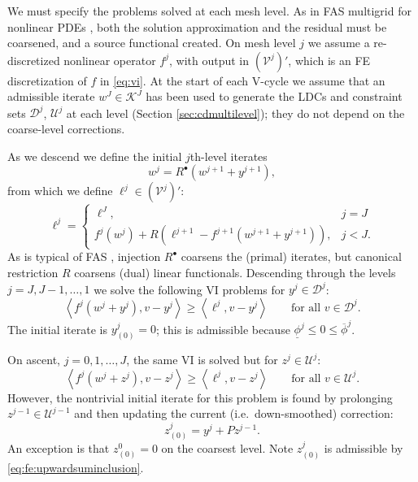 \documentclass[review,hidelinks,onefignum,onetabnum,final]{siamart220329}  %
\newcommand{\cV}{\mathcal{V}}
\newcommand{\ip}[2]{\left<#1,#2\right>}
\newcommand{\iR}{R^{\bullet}}
\begin{document}
We must specify the problems solved at each mesh level.  As in FAS multigrid for nonlinear PDEs \cite{BrandtLivne2011,Bruneetal2015,Trottenbergetal2001}, both the solution approximation and the residual must be coarsened, and a source functional created.  On mesh level $j$ we assume a re-discretized nonlinear operator $f^j$, with output in $(\cV^j)'$, which is an FE discretization of $f$ in \eqref{eq:vi}.  At the start of each V-cycle we assume that an admissible iterate $w^J \in \mathcal{K}^J$ has been used to generate the LDCs and constraint sets $\mathcal{D}^j$, $\mathcal{U}^j$ at each level (Section \ref{sec:cdmultilevel}); they do not depend on the coarse-level corrections.

As we descend we define the initial $j$th-level iterates
\begin{equation}
w^j = \iR(w^{j+1} + y^{j+1}),  \label{eq:fe:definew}
\end{equation}
from which we define $\ell^j \in (\cV^j)'$:
\begin{equation}
\ell^j = \begin{cases} \ell^J, & j=J \\
                       f^j(w^j) + R\left(\ell^{j+1}-f^{j+1}(w^{j+1}+y^{j+1})\right), & j<J. \end{cases} \label{eq:fe:levelsource}
\end{equation}
As is typical of FAS \cite[section 5.3]{Trottenbergetal2001}, injection $\iR$ coarsens the (primal) iterates, but canonical restriction $R$ coarsens (dual) linear functionals.  Descending through the levels $j=J,J-1,\dots,1$ we solve the following VI problems for $y^j \in \mathcal{D}^j$:
\begin{equation}
\ip{f^j(w^j + y^j)}{v-y^j} \ge \ip{\ell^j}{v-y^j} \qquad \text{for all } v\in \mathcal{D}^j. \label{eq:fe:downvi}
\end{equation}
The initial iterate is $y_{(0)}^j=0$; this is admissible because $\underline{\phi}^j \le 0 \le \overline{\phi}^j$.

On ascent, $j=0,1,\dots,J$, the same VI is solved but for $z^j \in \mathcal{U}^j$:
\begin{equation}
\ip{f^j(w^j + z^j)}{v-z^j} \ge \ip{\ell^j}{v-z^j} \qquad \text{for all } v\in \mathcal{U}^j. \label{eq:fe:upvi}
\end{equation}
However, the nontrivial initial iterate for this problem is found by prolonging $z^{j-1} \in \mathcal{U}^{j-1}$ and then updating the current (i.e.~down-smoothed) correction:
\begin{equation}
z_{(0)}^j = y^j + P z^{j-1}.  \label{eq:fe:upwardinitial}
\end{equation}
An exception is that $z_{(0)}^0=0$ on the coarsest level.  Note $z_{(0)}^j$ is admissible by \eqref{eq:fe:upwardsuminclusion}.
\end{document}
